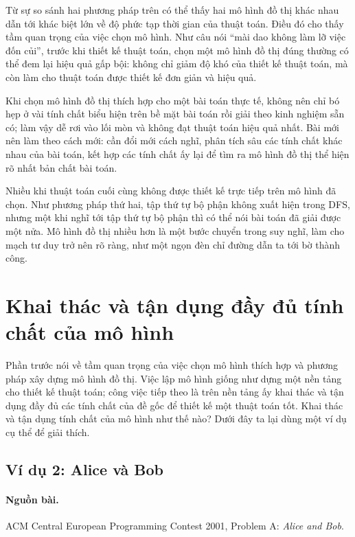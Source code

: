 \documentclass[11pt]{article}
\begin{document}
Từ sự so sánh hai phương pháp trên có thể thấy hai mô hình đồ thị khác nhau
dẫn tới khác biệt lớn về độ phức tạp thời gian của thuật toán. Điều đó cho
thấy tầm quan trọng của việc chọn mô hình. Như câu nói ``mài dao không làm lỡ
việc đốn củi'', trước khi thiết kế thuật toán, chọn một mô hình đồ thị đúng
thường có thể đem lại hiệu quả gấp bội: không chỉ giảm độ khó của thiết kế
thuật toán, mà còn làm cho thuật toán được thiết kế đơn giản và hiệu quả.

Khi chọn mô hình đồ thị thích hợp cho một bài toán thực tế, không nên chỉ bó
hẹp ở vài tính chất biểu hiện trên bề mặt bài toán rồi giải theo kinh nghiệm
sẵn có; làm vậy dễ rơi vào lối mòn và không đạt thuật toán hiệu quả nhất. Bài
mới nên làm theo cách mới: cần đổi mới cách nghĩ, phân tích sâu các tính chất
khác nhau của bài toán, kết hợp các tính chất ấy lại để tìm ra mô hình đồ thị
thể hiện rõ nhất bản chất bài toán.

Nhiều khi thuật toán cuối cùng không được thiết kế trực tiếp trên mô hình đã
chọn. Như phương pháp thứ hai, tập thứ tự bộ phận không xuất hiện trong DFS,
nhưng một khi nghĩ tới tập thứ tự bộ phận thì có thể nói bài toán đã giải được
một nửa. Mô hình đồ thị nhiều hơn là một bước chuyển trong suy nghĩ, làm cho
mạch tư duy trở nên rõ ràng, như một ngọn đèn chỉ đường dẫn ta tới bờ thành
công.

\section{Khai thác và tận dụng đầy đủ tính chất của mô hình}

Phần trước nói về tầm quan trọng của việc chọn mô hình thích hợp và phương
pháp xây dựng mô hình đồ thị. Việc lập mô hình giống như dựng một nền tảng cho
thiết kế thuật toán; công việc tiếp theo là trên nền tảng ấy khai thác và tận
dụng đầy đủ các tính chất của đề gốc để thiết kế một thuật toán tốt. Khai thác
và tận dụng tính chất của mô hình như thế nào? Dưới đây ta lại dùng một ví dụ
cụ thể để giải thích.

\subsection{Ví dụ 2: Alice và Bob}

\paragraph{Nguồn bài.}
ACM Central European Programming Contest 2001, Problem A: \emph{Alice and Bob}.
\end{document}

